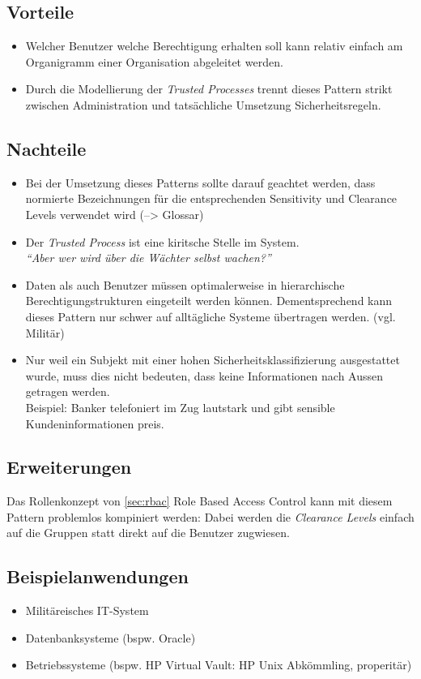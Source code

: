 \subsection*{Vorteile}
\begin{itemize}
	\item Welcher Benutzer welche Berechtigung erhalten soll kann relativ einfach am Organigramm einer Organisation abgeleitet werden.
	\item Durch die Modellierung der \emph{Trusted Processes} trennt dieses Pattern strikt zwischen Administration und tatsächliche Umsetzung Sicherheitsregeln.
\end{itemize}

\subsection*{Nachteile}
\begin{itemize}
	\item Bei der Umsetzung dieses Patterns sollte darauf geachtet werden, dass normierte Bezeichnungen für die entsprechenden Sensitivity und Clearance Levels verwendet wird (--> Glossar)
	\item Der \emph{Trusted Process} ist eine kiritsche Stelle im System.\\
	\emph{``Aber wer wird über die Wächter selbst wachen?''}
	\item Daten als auch Benutzer müssen optimalerweise in hierarchische Berechtigungstrukturen eingeteilt werden können.
	Dementsprechend kann dieses Pattern nur schwer auf alltägliche Systeme übertragen werden. (vgl. Militär)
	\item Nur weil ein Subjekt mit einer hohen Sicherheitsklassifizierung ausgestattet wurde, muss dies nicht bedeuten, dass keine Informationen nach Aussen getragen werden.\\Beispiel: Banker telefoniert im Zug lautstark und gibt sensible Kundeninformationen preis.
\end{itemize}

\subsection*{Erweiterungen}
Das Rollenkonzept von \ref{sec:rbac} Role Based Access Control kann mit diesem Pattern problemlos kompiniert werden: Dabei werden die \emph{Clearance Levels} einfach auf die Gruppen statt direkt auf die Benutzer zugwiesen.

\subsection*{Beispielanwendungen}
\begin{itemize}
	\item Militäreisches IT-System
	\item Datenbanksysteme (bspw. Oracle)
	\item Betriebssysteme (bspw. HP Virtual Vault: HP Unix Abkömmling, properitär)
\end{itemize}